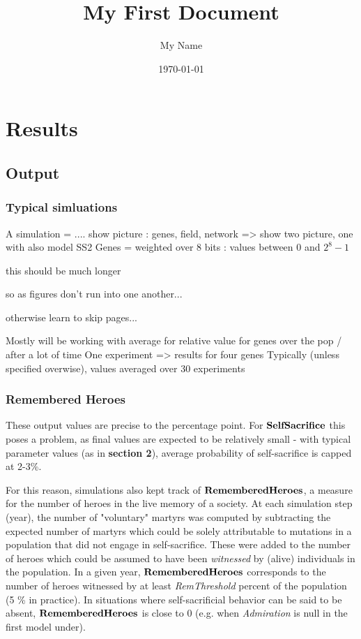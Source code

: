 \documentclass[a4paper,12pt]{article}
\begin{document}
\setlength{\parindent}{0pt}
\setlength{\parskip}{6pt}


\title{My First Document}\author{My Name}\date{\today}\maketitle

\tableofcontents\newpage{}

\section{Results}
\subsection{Output}
\subsubsection{Typical simluations}

A simulation = .... show picture : genes, field, network
=> show two picture, one with also model SS2
Genes = weighted over 8 bits : values between $0$ and $2^8 - 1$

this should be much longer


so as figures don't run into one another... 

otherwise learn to skip pages...

Mostly will be working with average for relative value for genes over the pop / after a lot of time
One experiment => results for four genes
Typically (unless specified overwise), values averaged over 30 experiments

\subsubsection{Remembered Heroes}
\label{ss:RH}
These output values are precise to the percentage point. 
For $\bf{SelfSacrifice}$ this poses a problem, as final values are expected to be relatively
small - with typical parameter values (as in \textbf{section 2}), average probability of self-sacrifice
 is capped at 2-3\%.

For this reason, simulations also kept track of $\bf{RememberedHeroes}$, a measure for the number of heroes 
in the live memory of a society. At each simulation step (year), the number of "voluntary" martyrs was computed
 by subtracting the expected number of martyrs which could be solely attributable to mutations in a population
 that did not engage in self-sacrifice. These were added to the number of heroes which could be assumed to have
 been \emph{witnessed} by (alive) individuals in the population. In a given year, $\bf{RememberedHeroes}$ corresponds
 to the number of heroes witnessed by at least \emph{RemThreshold} percent of the population (5 \% in practice).
 In situations where self-sacrificial behavior can be said to be absent, $\bf{RememberedHeroes}$ is close to 0
 (e.g. when \emph{Admiration} is null in the first model under).
\end{document}
